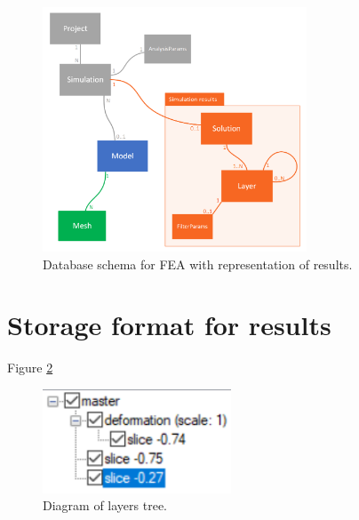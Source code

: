 \begin{figure}[H]
    \centering
    \includegraphics[width=0.7\textwidth]{figures/FEA-database-schema-with-results}
    \decoRule
    \caption{Database schema for FEA with representation of results.}
    \label{fig:FEA-db-schema-results}
\end{figure}



\section{Storage format for results}
\label{sec:storage-format}



Figure \ref{fig:layers-tree}

\begin{figure}[H]
    \centering
    \includegraphics[width=0.5\textwidth]{figures/layers-tree-diagram}
    \decoRule
    \caption{Diagram of layers tree.}
    \label{fig:layers-tree}
\end{figure}

